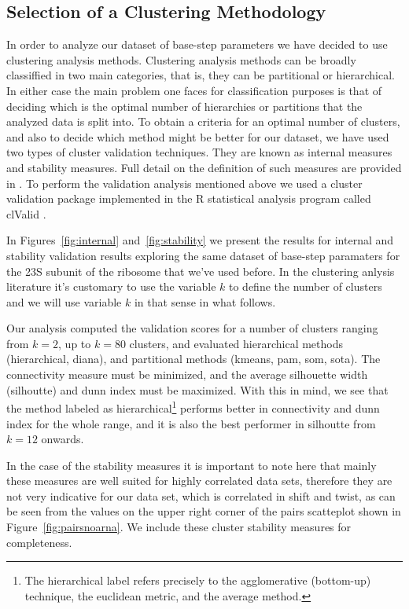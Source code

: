 \subsection{Selection of a Clustering Methodology}
In  order to  analyze  our  dataset of  base-step  parameters we  have
decided  to  use  clustering  analysis methods.   Clustering  analysis
methods can  be broadly classiffied  in two main categories,  that is,
they  can be  partitional or  hierarchical.  In  either case  the main
problem  one faces  for classification  purposes is  that  of deciding
which  is the  optimal number  of hierarchies  or partitions  that the
analyzed  data is split  into.  To  obtain a  criteria for  an optimal
number of  clusters, and also to  decide which method  might be better
for  our  dataset,  we  have  used two  types  of  cluster  validation
techniques.   They  are  known  as  internal  measures  and  stability
measures. Full detail on the  definition of such measures are provided
in  \cite{handl2005, brock2008}.  To  perform the  validation analysis
mentioned above  we used a  cluster validation package  implemented in
the  R  \cite{rcite}   statistical  analysis  program  called  clValid
\cite{brock2008}.

In  Figures~\ref{fig:internal} and~\ref{fig:stability} we  present the
results for  internal and  stability validation results  exploring the
same  dataset of  base-step  paramaters  for the  23S  subunit of  the
ribosome that we've used  before. In the clustering anlysis literature
it's  customary  to use  the  variable $k$  to  define  the number  of
clusters  and  we  will  use  variable  $k$  in  that  sense  in  what
follows.

Our analysis computed  the validation scores for a  number of clusters
ranging from $k=2$, up  to $k=80$ clusters, and evaluated hierarchical
methods (hierarchical,  diana), and partitional  methods (kmeans, pam,
som,  sota).  The  connectivity  measure must  be  minimized, and  the
average silhouette width (silhoutte) and dunn index must be maximized.
With   this   in  mind,   we   see   that   the  method   labeled   as
hierarchical\footnote{The hierarchical  label refers precisely  to the
  agglomerative (bottom-up)  technique, the euclidean  metric, and the
  average method.}  performs better in connectivity and dunn index for
the whole range,  and it is also the best  performer in silhoutte from
$k=12$ onwards.

In the  case of the  stability measures it  is important to  note here
that mainly these measures are  well suited for highly correlated data
sets, therefore they  are not very indicative for  our data set, which
is correlated  in shift and twist, as  can be seen from  the values on
the   upper  right   corner   of  the   pairs   scatteplot  shown   in
Figure~\ref{fig:pairsnoarna}.    We  include  these cluster  stability
measures for completeness.

